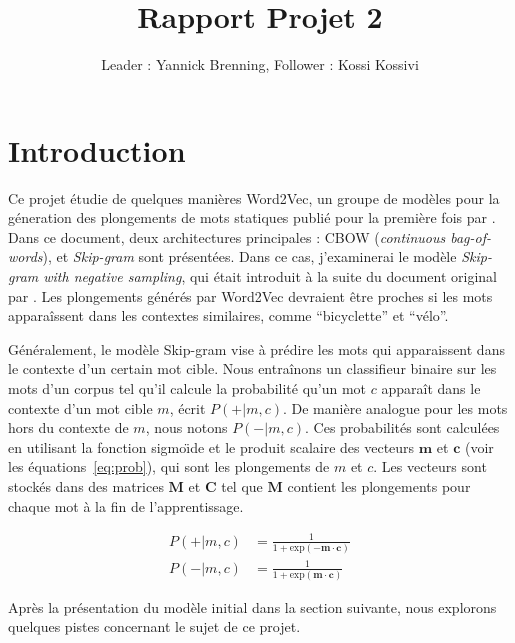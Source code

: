 \documentclass[12pt]{article}
\title{Rapport Projet 2}
\author{Leader : Yannick Brenning, Follower : Kossi Kossivi}
\begin{document}
\maketitle

\vspace{0.5in}

\section{Introduction} \label{introduction}

Ce projet étudie de quelques manières Word2Vec, un groupe de modèles pour la géneration des plongements de mots statiques publié pour la première fois par \cite{DBLP:journals/corr/abs-1301-3781}. Dans ce document, deux architectures principales : CBOW (\textit{continuous bag-of-words}), et \textit{Skip-gram} sont présentées. Dans ce cas, j'examinerai le modèle \textit{Skip-gram with negative sampling}, qui était introduit à la suite du document original par \cite{DBLP:conf/nips/MikolovSCCD13}. Les plongements générés par Word2Vec devraient être proches si les mots apparaîssent dans les contextes similaires, comme ``bicyclette'' et ``vélo''.

Généralement, le modèle Skip-gram vise à prédire les mots qui apparaissent dans le contexte d'un certain mot cible. Nous entraînons un classifieur binaire sur les mots d'un corpus tel qu'il calcule la probabilité qu'un mot $c$ apparaît dans le contexte d'un mot cible $m$, écrit $P(+|m, c)$. De manière analogue pour les mots hors du contexte de $m$, nous notons $P(-|m, c)$. Ces probabilités sont calculées en utilisant la fonction sigmo\"\i de et le produit scalaire des vecteurs $\mathbf{m} $ et $ \mathbf{c} $ (voir les équations~\ref{eq:prob}), qui sont les plongements de $m$ et $c$. Les vecteurs sont stockés dans des matrices $\mathbf{M}$ et $\mathbf{C}$ tel que $\mathbf{M}$ contient les plongements pour chaque mot à la fin de l'apprentissage.

\begin{equation}\label{eq:prob}
\begin{split}
    P(+|m, c) & = \frac{1}{1 + \text{exp}(-\mathbf{m} \cdot \mathbf{c})} \\
    P(-|m, c) & = \frac{1}{1 + \text{exp}(\mathbf{m} \cdot \mathbf{c})} 
\end{split}
\end{equation}

Après la présentation du modèle initial dans la section suivante, nous explorons quelques pistes concernant le sujet de ce projet.
\end{document}
